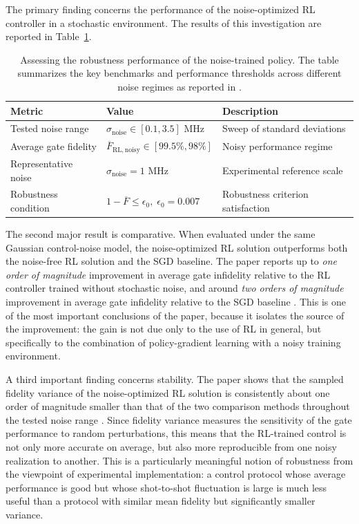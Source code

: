 The primary finding concerns the performance of the noise-optimized RL controller in a stochastic environment. The results of this investigation are reported in Table~\ref{tab:robustness_results_summary}.

\begin{table}[htpb]
\centering
\renewcommand{\arraystretch}{1.4}
\begin{tabular}{lll}
\hline
\textbf{Metric} & \textbf{Value} & \textbf{Description} \\
\hline
Tested noise range & $\sigma_{\mathrm{noise}} \in [0.1, 3.5]$ MHz & Sweep of standard deviations \\
Average gate fidelity & $\overline{F}_{\mathrm{RL,noisy}} \in [99.5\%, 98\%]$ & Noisy performance regime \\
Representative noise & $\sigma_{\mathrm{noise}} = 1$ MHz & Experimental reference scale \\
Robustness condition & $1-\overline{F} \le \epsilon_0, \;\epsilon_0 = 0.007$ & Robustness criterion satisfaction \\
\hline
\end{tabular}
\vspace{0.5em}
\caption{Assessing the robustness performance of the noise-trained policy. The table summarizes the key benchmarks and performance thresholds across different noise regimes as reported in \cite{Niu2019}.}
\label{tab:robustness_results_summary}
\end{table}

The second major result is comparative. When evaluated under the same Gaussian control-noise model, the noise-optimized RL solution outperforms both the noise-free RL solution and the SGD baseline. The paper reports up to
\emph{one order of magnitude} improvement in average gate infidelity relative to the RL controller trained without stochastic noise, and around \emph{two orders of magnitude} improvement in average gate infidelity relative to the SGD baseline \cite{Niu2019}. This is one of the most important conclusions of the paper, because it isolates the source of the improvement: the gain is not due only to the use of RL in general, but specifically to the combination of policy-gradient learning with a noisy training environment.

A third important finding concerns stability. The paper shows that the sampled fidelity variance of the noise-optimized RL solution is consistently about one order of magnitude smaller than that of the two comparison methods throughout the tested noise range \cite{Niu2019}. Since fidelity variance measures the sensitivity of the gate performance to random perturbations, this means that the RL-trained control is not only more accurate on average, but also more reproducible from one noisy realization to another. This is a particularly meaningful notion of robustness from the viewpoint of experimental implementation: a control protocol whose average performance is good but whose shot-to-shot fluctuation is large is much less useful than a protocol with similar mean fidelity but significantly smaller variance.

